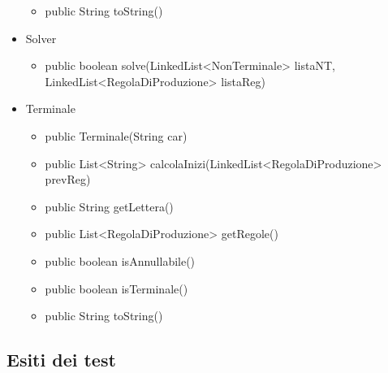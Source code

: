 \documentclass[12pt]{article}
\begin{document}
\begin{itemize}
\begin{itemize}
\item public String toString()
\end{itemize}
\item Solver
\begin{itemize}
\item public boolean solve(LinkedList<NonTerminale> listaNT, \\
\hspace*{104pt} LinkedList<RegolaDiProduzione> listaReg)
\end{itemize}
\item Terminale
\begin{itemize}
\item public Terminale(String car)
\item public List<String> calcolaInizi(LinkedList<RegolaDiProduzione> prevReg)
\item public String getLettera()
\item public List<RegolaDiProduzione> getRegole()
\item public boolean isAnnullabile()
\item public boolean isTerminale()
\item public String toString()
\end{itemize}
\end{itemize}
\pagebreak

\subsection{Esiti dei test}
\end{document}
